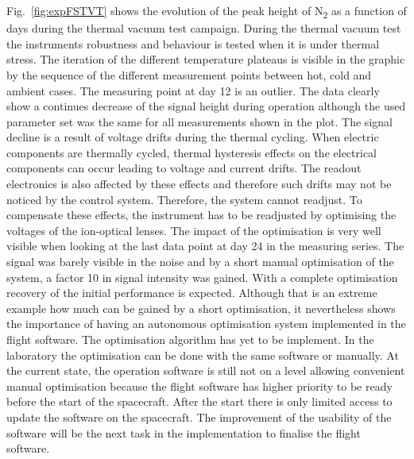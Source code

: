 		Fig.~\ref{fig:expFSTVT} shows the evolution of the peak height of N\textsubscript{2} as a function of days during the thermal vacuum test campaign. During the thermal vacuum test the instruments robustness and behaviour is tested when it is under thermal stress. The iteration of the different temperature plateaus is visible in the graphic by the sequence of the different measurement points between hot, cold and ambient cases. The measuring point at day 12 is an outlier. The data clearly show a continues decrease of the signal height during operation although the used parameter set was the same for all measurements shown in the plot. The signal decline is a result of voltage drifts during the thermal cycling. When electric components are thermally cycled, thermal hysteresis effects on the electrical components can occur leading to voltage and current drifts. The readout electronics is also affected by these effects and therefore such drifts may not be noticed by the control system. Therefore, the system cannot readjust. To compensate these effects, the instrument has to be readjusted by optimising the voltages of the ion-optical lenses. The impact of the optimisation is very well visible when looking at the last data point at day 24 in the measuring series. The signal was barely visible in the noise and by a short manual optimisation of the system, a factor 10 in signal intensity was gained. With a complete optimisation recovery of the initial performance is expected. Although that is an extreme example how much can be gained by a short optimisation, it nevertheless shows the importance of having an autonomous optimisation system implemented in the flight software. The optimisation algorithm has yet to be implement. In the laboratory the optimisation can be done with the same software or manually. At the current state, the operation software is still not on a level allowing convenient manual optimisation because the flight software has higher priority to be ready before the start of the spacecraft. After the start there is only limited access to update the software on the spacecraft. The improvement of the usability of the software will be the next task in the implementation to finalise the flight software.
		
		
		
		
		
		
	
	
	
	